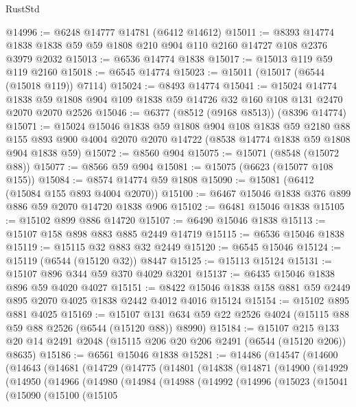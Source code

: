 \begin{lexlean}{RustStd}
\begin{coremodule}
@14996 := @6248 @14777 @14781 (@6412 @14612)
@15011 := @8393 @14774 @1838 @1838 @59 @59 @1808 @210 @904 @110 @2160 @14727 @108 @2376 @3979 @2032
@15013 := @6536 @14774 @1838
@15017 := @15013 @119 @59 @119 @2160
@15018 := @6545 @14774
@15023 := @15011 (@15017 (@6544 (@15018 @119)) @7114)
@15024 := @8493 @14774
@15041 := @15024
    @14774
    @1838
    @59
    @1808
    @904
    @109
    @1838
    @59
    @14726
    @32
    @160
    @108
    @131
    @2470
    @2070
    @2070
    @2526
@15046 := @6377 (@8512 (@9168 @8513)) (@8396 @14774)
@15071 := @15024
    @15046
    @1838
    @59
    @1808
    @904
    @108
    @1838
    @59
    @2180
    @88
    @155
    @893
    @900
    @4004
    @2070
    @2070
    @14722
    (@8538 @14774 @1838 @59 @1808 @904 @1838 @59)
@15072 := @8560 @904
@15075 := @15071 (@8548 (@15072 @88))
@15077 := @8566 @59 @904
@15081 := @15075 (@6623 (@15077 @108 @155))
@15084 := @8574 @14774 @59 @1808
@15090 := @15081 (@6412 (@15084 @155 @893 @4004 @2070))
@15100 := @6467 @15046 @1838 @376 @899 @886 @59 @2070 @14720 @1838 @906
@15102 := @6481 @15046 @1838
@15105 := @15102 @899 @886 @14720
@15107 := @6490 @15046 @1838
@15113 := @15107 @158 @898 @883 @885 @2449 @14719
@15115 := @6536 @15046 @1838
@15119 := @15115 @32 @883 @32 @2449
@15120 := @6545 @15046
@15124 := @15119 (@6544 (@15120 @32)) @8447
@15125 := @15113 @15124
@15131 := @15107 @896 @344 @59 @370 @4029 @3201
@15137 := @6435 @15046 @1838 @896 @59 @4020 @4027
@15151 := @8422 @15046 @1838 @158 @881 @59 @2449 @895 @2070 @4025 @1838 @2442 @4012 @4016 @15124
@15154 := @15102 @895 @881 @4025
@15169 := @15107 @131 @634 @59 @22 @2526 @4024 (@15115 @88 @59 @88 @2526 (@6544 (@15120 @88)) @8990)
@15184 := @15107
    @215
    @133
    @20
    @14
    @2491
    @2048
    (@15115 @206 @20 @206 @2491 (@6544 (@15120 @206)) @8635)
@15186 := @6561 @15046 @1838
@15281 := @14486
    (@14547
      (@14600
        (@14643
          (@14681
            (@14729
              (@14775
                (@14801
                  (@14838
                    (@14871
                      (@14900
                        (@14929
                          (@14950
                            (@14966
                              (@14980
                                (@14984
                                  (@14988
                                    (@14992
                                      (@14996
                                        (@15023
                                          (@15041
                                            (@15090
                                              (@15100
                                                (@15105

\end{coremodule}
\end{lexlean}
